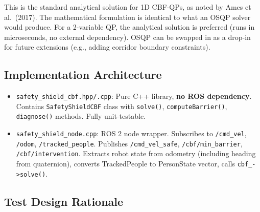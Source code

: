 \documentclass[11pt]{article}
\begin{document}
This is the standard analytical solution for 1D CBF-QPs, as noted by Ames et al.\ (2017). The mathematical formulation is identical to what an OSQP solver would produce. For a 2-variable QP, the analytical solution is preferred (runs in microseconds, no external dependency). OSQP can be swapped in as a drop-in for future extensions (e.g., adding corridor boundary constraints).

\subsection{Implementation Architecture}

\begin{itemize}
  \item \texttt{safety\_shield\_cbf.hpp/.cpp}: Pure C++ library, \textbf{no ROS dependency}. Contains \texttt{SafetyShieldCBF} class with \texttt{solve()}, \texttt{computeBarrier()}, \texttt{diagnose()} methods. Fully unit-testable.
  \item \texttt{safety\_shield\_node.cpp}: ROS 2 node wrapper. Subscribes to \texttt{/cmd\_vel}, \texttt{/odom}, \texttt{/tracked\_people}. Publishes \texttt{/cmd\_vel\_safe}, \texttt{/cbf/min\_barrier}, \texttt{/cbf/intervention}. Extracts robot state from odometry (including heading from quaternion), converts TrackedPeople to PersonState vector, calls \texttt{cbf\_->solve()}.
\end{itemize}

\subsection{Test Design Rationale}
\end{document}
